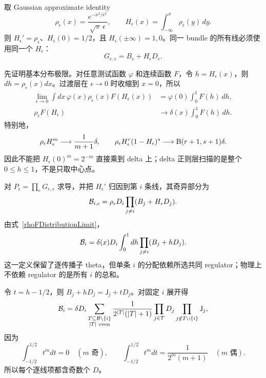 ﻿\documentclass[a4paper,11pt]{article}
\begin{document}
取 Gaussian approximate identity
\begin{equation}
 \rho_\epsilon(x)=\frac{e^{-x^2/\epsilon^2}}{\sqrt\pi\,\epsilon},
 \qquad
 H_\epsilon(x)=\int_{-\infty}^{x}\rho_\epsilon(y)\,dy.
 \label{gaussianMollifier}
\end{equation}
则 $H_\epsilon'=\rho_\epsilon$、$H_\epsilon(0)=1/2$，且 $H_\epsilon(\pm\infty)=1,0$。同一 bundle 的所有线必须使用同一个 $H_\epsilon$：
\begin{equation}
 G_{e,\epsilon}=B_e+H_\epsilon D_e.
 \label{regularizedLine}
\end{equation}

先证明基本分布极限。对任意测试函数 $\varphi$ 和连续函数 $F$，令 $h=H_\epsilon(x)$，则 $dh=\rho_\epsilon(x)dx$。过渡层在 $\epsilon\to0$ 时收缩到 $x=0$，所以
\begin{align}
 \lim_{\epsilon\to0}
 \int dx\,\varphi(x)\rho_\epsilon(x)F(H_\epsilon(x))
 &=\varphi(0)\int_0^1F(h)\,dh,\\
 \rho_\epsilon F(H_\epsilon)
 &\longrightarrow
 \delta(x)\int_0^1F(h)\,dh.
 \label{rhoFDistributionLimit}
\end{align}
特别地，
\begin{equation}
 \rho_\epsilon H_\epsilon^m\longrightarrow\frac{1}{m+1}\delta,
 \qquad
 \rho_\epsilon H_\epsilon^r(1-H_\epsilon)^s
 \longrightarrow {\rm B}(r+1,s+1)\delta.
 \label{rhoPowerLimits}
\end{equation}
因此不能把 $H_\epsilon(0)^m=2^{-m}$ 直接乘到 delta 上；delta 正则层扫描的是整个 $0\le h\le1$，不是只取中心点。

对 $P_\epsilon=\prod_eG_{e,\epsilon}$ 求导，并把 $H_\epsilon'$ 归因到第 $i$ 条线，其奇异部分为
\begin{equation}
 {\cal B}_{i,\epsilon}
 =\rho_\epsilon D_i
 \prod_{j\ne i}(B_j+H_\epsilon D_j).
\end{equation}
由式~\eqref{rhoFDistributionLimit}，
\begin{equation}
 {\cal B}_i
 =\delta(x)D_i\int_0^1dh
 \prod_{j\ne i}(B_j+hD_j).
 \label{lineResolvedBoundary}
\end{equation}
这一定义保留了逐传播子 theta，但单条 $i$ 的分配依赖所选共同 regulator；物理上不依赖 regulator 的是所有 $i$ 的总和。

令 $t=h-1/2$，则 $B_j+hD_j=\mathsf J_j+tD_j$。对固定 $i$ 展开得
\begin{equation}
 {\cal B}_i
 =\delta D_i
 \sum_{\substack{T\subseteq\mathcal B\setminus\{i\}\\|T|\ {\rm even}}}
 \frac{1}{2^{|T|}(|T|+1)}
 \prod_{j\in T}D_j
 \prod_{j\notin T\cup\{i\}}\mathsf J_j,
 \label{lineResolvedMomentExpansion}
\end{equation}
因为
\begin{equation}
 \int_{-1/2}^{1/2}t^m dt
 =0\quad(m\text{ 奇}),
 \qquad
 \int_{-1/2}^{1/2}t^m dt
 =\frac{1}{2^m(m+1)}\quad(m\text{ 偶}).
\end{equation}
所以每个逐线项都含奇数个 $D$。
\end{document}
